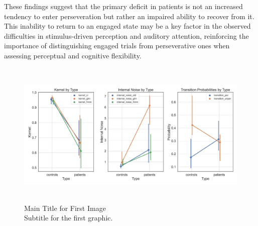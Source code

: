 These findings suggest that the primary deficit in patients is not an increased tendency to enter perseveration but rather an impaired ability to recover from it. This inability to return to an engaged state may be a key factor in the observed difficulties in stimulus-driven perception and auditory attention, reinforcing the importance of distinguishing engaged trials from perseverative ones when assessing perceptual and cognitive flexibility.
\begin{figure}[H]
    \centering
    \includegraphics[width=17cm,height=7cm]{MainLayout/Images/chapter8/revcor_measures.jpg}
    \caption{Main Title for First Image \\ \small Subtitle for the first graphic.}
    \label{fig:revcor_measures}
\end{figure}
